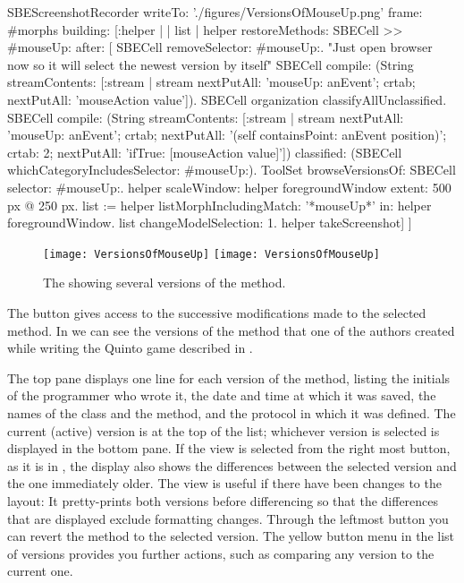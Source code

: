 \documentclass[a4paper,10pt,twoside]{book}
\begin{document}
\begin{ExecuteSmalltalkScript}
SBEScreenshotRecorder writeTo: './figures/VersionsOfMouseUp.png' frame: #morphs building: [:helper |
	| list |
	helper restoreMethods: {SBECell >> #mouseUp:} after: [
		SBECell removeSelector: #mouseUp:.
		"Just open browser now so it will select the newest version by itself"
		SBECell
			compile: (String streamContents: [:stream | stream
				nextPutAll: 'mouseUp: anEvent';
				crtab; nextPutAll: 'mouseAction value']).
		SBECell organization classifyAllUnclassified.
		SBECell
			compile: (String streamContents: [:stream | stream
				nextPutAll: 'mouseUp: anEvent';
				crtab; nextPutAll: '(self containsPoint: anEvent position)';
				crtab: 2; nextPutAll: 'ifTrue: [mouseAction value]'])
			classified: (SBECell whichCategoryIncludesSelector: #mouseUp:).
		ToolSet browseVersionsOf: SBECell selector: #mouseUp:.
		helper scaleWindow: helper foregroundWindow extent: 500 px @ 250 px.
		list := helper listMorphIncludingMatch: '*mouseUp*' in: helper foregroundWindow.
		list changeModelSelection: 1.
		helper takeScreenshot]
]
\end{ExecuteSmalltalkScript}
\begin{figure}[btp]
   \centering
   \ifluluelse
	   {\texttt{[image: VersionsOfMouseUp]} }
	   {\texttt{[image: VersionsOfMouseUp]} }
   \caption{The  showing several versions of the  method.}
   \label{fig:mouseUpVersions}
\end{figure}
The  button gives access to the successive modifications made to the selected method.
In  we can see the versions of the  method that one of the authors created while writing the Quinto game described in .

The top pane displays one line for each version of the method, listing the initials of the programmer who wrote it, the date and time at which it was saved, the names of the class and the method, and the protocol in which it was defined.
The current (active) version is at the top of the list; whichever version is selected is displayed in the bottom pane.
If the  view is selected from the right most button, as it is in , the display also shows the differences between the selected version and the one immediately older.
The  view is useful if there have been changes to the layout: It pretty-prints both versions before differencing so that the differences that are displayed exclude formatting changes.
Through the leftmost button you can revert the method to the selected version.
The yellow button menu in the list of versions provides you further actions, such as comparing any version to the current one.
\end{document}
